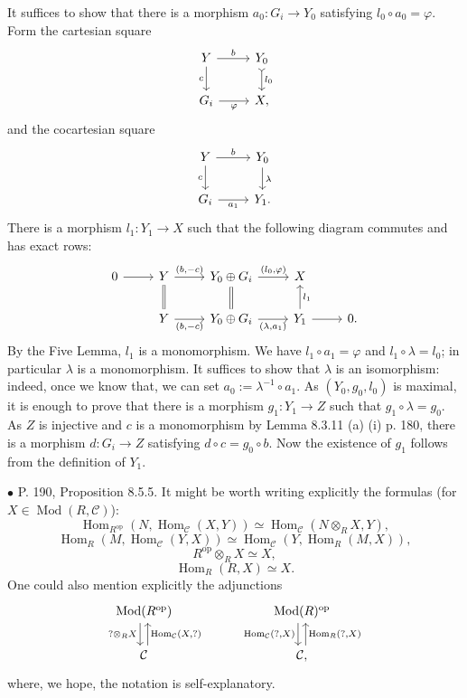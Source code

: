 \documentclass[12pt]{article}
\theoremstyle{remark}
\newcommand{\bu}{\bullet}
\newcommand{\n}{\noindent}
\newcommand{\C}{\mathcal C}
\newcommand{\op}{\text{op}}
\newcommand{\p}{\varphi}
\DeclareMathOperator{\Hom}{Hom}
\DeclareMathOperator{\Mod}{Mod}
\begin{document}
It suffices to show that there is a morphism $a_0:G_i\to Y_0$ satisfying $l_0\circ a_0=\p$. Form the cartesian square 
$$
\begin{tikzcd}
Y\ar{r}{b}\ar[swap]{d}{c}&Y_0\ar[tail]{d}{l_0}\\
G_i\ar[swap]{r}{\p}&X,
\end{tikzcd}
$$
and the cocartesian square 
$$
\begin{tikzcd}
Y\ar{r}{b}\ar[swap]{d}{c}&Y_0\ar{d}{\lambda}\\
G_i\ar[swap]{r}{a_1}&Y_1.
\end{tikzcd}
$$ 
There is a morphism $l_1:Y_1\to X$ such that the following diagram commutes and has exact rows: 
$$
\begin{tikzcd}
0\ar{r}&Y\ar[equal]{d}\ar{r}{(b,-c)}&Y_0\oplus G_i\ar[equal]{d}\ar{r}{(l_0,\p)}&X\\
&Y\ar{r}[swap]{(b,-c)}&Y_0\oplus G_i\ar{r}[swap]{(\lambda,a_1)}&Y_1\ar{r}\ar{u}[swap]{l_1}&0.
\end{tikzcd}
$$ 
By the Five Lemma, $l_1$ is a monomorphism. We have $l_1\circ a_1=\p$ and $l_1\circ\lambda=l_0$; in particular $\lambda$ is a monomorphism. It suffices to show that $\lambda$ is an isomorphism: indeed, once we know that, we can set $a_0:=\lambda^{-1}\circ a_1$. As $(Y_0,g_0,l_0)$ is maximal, it is enough to prove that there is a morphism $g_1:Y_1\to Z$ such that $g_1\circ\lambda=g_0$. As $Z$ is injective and $c$ is a monomorphism by Lemma 8.3.11 (a) (i) p. 180, there is a morphism $d:G_i\to Z$ satisfying $d\circ c=g_0\circ b$. Now the existence of $g_1$ follows from the definition of $Y_1$. 


\n$\bu$ P. 190, Proposition 8.5.5. It might be worth writing explicitly the formulas (for $X\in\Mod(R,\C)$):
$$
\Hom_{R^\op}(N,\Hom_\C(X,Y))\simeq
\Hom_\C\left(N\otimes_RX,Y\right),
$$
$$
\Hom_R(M,\Hom_\C(Y,X))\simeq
\Hom_\C\left(Y,\Hom_R(M,X)\right),
$$
$$
R^\op\otimes_RX\simeq X,
$$
$$
\Hom_R(R,X)\simeq X.
$$
One could also mention explicitly the adjunctions
$$
\begin{tikzcd}
\Mod(R^\op)\ar[xshift=-0.7ex]{d}[swap]{?\otimes_RX}&&&
\Mod(R)^\op\ar[xshift=-0.7ex]{d}[swap]{\Hom_\C(?,X)}\\
\C\ar[xshift=0.7ex]{u}[swap]{\Hom_\C(X,?)}&&&\C,\ar[xshift=0.7ex]{u}[swap]{\Hom_R(?,X)}
\end{tikzcd}
$$
where, we hope, the notation is self-explanatory. 

\end{document}
